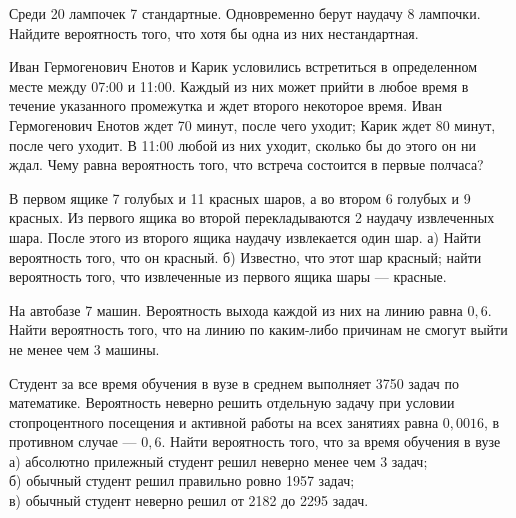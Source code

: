 \documentclass[12pt,a4paper,%
]{scrartcl}
\begin{document}
\newpage\setcounter{zad}{0}





\begin{zkrW}{20}\noindent Среди 20 лампочек 7 стандартные. Одновременно берут наудачу 8 лампочки. Найдите вероятность того, что хотя бы одна из них нестандартная.
 \end{zkrW}

\vfill


\begin{zkrW}{20}\noindent Иван Гермогенович Енотов и Карик условились встретиться в определенном месте между 07:00 и 11:00. Каждый из них может прийти в любое время в течение указанного промежутка и ждет второго некоторое время. Иван Гермогенович Енотов ждет 70 минут, после чего уходит; Карик ждет 80 минут, после чего уходит. В 11:00 любой из них уходит, сколько бы до этого он ни ждал. Чему равна вероятность того, что встреча состоится в первые полчаса?
 \end{zkrW}

\vfill


\begin{zkrW}{20}\noindent В первом ящике 7 голубых и 11 красных шаров, а во втором 6 голубых и 9 красных. Из первого ящика во второй перекладываются 2 наудачу извлеченных шара. После этого из второго ящика наудачу извлекается один шар. а) Найти вероятность того, что он красный. б) Известно, что этот шар красный; найти вероятность того, что извлеченные из первого ящика шары --- красные.
 \end{zkrW}

\vfill



\begin{zkrW}{20}\noindent На автобазе 7 машин. Вероятность выхода каждой из них на линию равна $0{,}6$. Найти вероятность того, что на линию по каким-либо причинам не смогут выйти не менее чем 3 машины.
 \end{zkrW}

\vfill



\begin{zkrW}{20}\noindent Студент за все время обучения в вузе в среднем выполняет 3750 задач по математике. Вероятность неверно решить отдельную задачу при условии стопроцентного посещения и активной работы на всех занятиях равна $0{,}0016$, в противном случае --- $0{,}6$. Найти вероятность того, что за время обучения в вузе \\ \indent а) абсолютно прилежный студент решил неверно менее чем 3 задач; \\ \indent б) обычный студент решил правильно ровно 1957 задач; \\ \indent в) обычный студент неверно решил от 2182 до 2295 задач.
 \end{zkrW}
\end{document}
